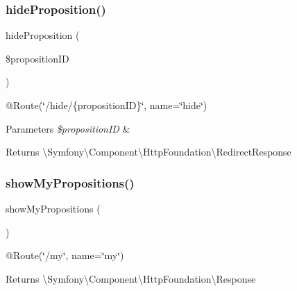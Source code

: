 \subsubsection{\texorpdfstring{hideProposition()}{hideProposition()}}
{\footnotesize\ttfamily hide\+Proposition (\begin{DoxyParamCaption}\item[{}]{\$proposition\+ID }\end{DoxyParamCaption})}

@\+Route(\char`\"{}/hide/\{proposition\+I\+D\}\char`\"{}, name=\char`\"{}hide\char`\"{}) 
\begin{DoxyParams}{Parameters}
{\em \$proposition\+ID} & \\
\hline
\end{DoxyParams}
\begin{DoxyReturn}{Returns}
\textbackslash{}\+Symfony\textbackslash{}\+Component\textbackslash{}\+Http\+Foundation\textbackslash{}\+Redirect\+Response 
\end{DoxyReturn}
\mbox{\label{class_app_1_1_controller_1_1_proposition_controller_ad1b04fa5361ba787d3b028b744107151}} 
\subsubsection{\texorpdfstring{showMyPropositions()}{showMyPropositions()}}
{\footnotesize\ttfamily show\+My\+Propositions (\begin{DoxyParamCaption}{ }\end{DoxyParamCaption})}

@\+Route(\char`\"{}/my\char`\"{}, name=\char`\"{}my\char`\"{}) \begin{DoxyReturn}{Returns}
\textbackslash{}\+Symfony\textbackslash{}\+Component\textbackslash{}\+Http\+Foundation\textbackslash{}\+Response 
\end{DoxyReturn}
\mbox{\label{class_app_1_1_controller_1_1_proposition_controller_a0181c8da3578351864cc96a333cdee91}} 
